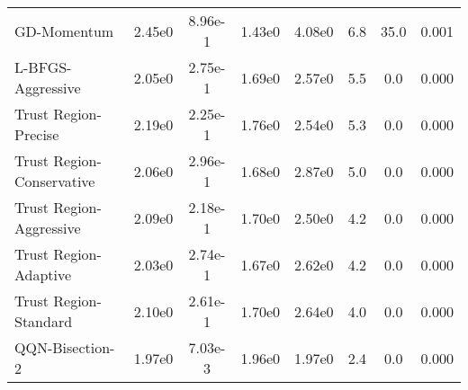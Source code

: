 \documentclass{article}
\begin{document}
\begin{table}[htbp]
{\begin{tabular}{p{2.5cm}*{7}{c}}
GD-Momentum & 2.45e0 & 8.96e-1 & 1.43e0 & 4.08e0 & 6.8 & 35.0 & 0.001 \\
L-BFGS-Aggressive & 2.05e0 & 2.75e-1 & 1.69e0 & 2.57e0 & 5.5 & 0.0 & 0.000 \\
Trust Region-Precise & 2.19e0 & 2.25e-1 & 1.76e0 & 2.54e0 & 5.3 & 0.0 & 0.000 \\
Trust Region-Conservative & 2.06e0 & 2.96e-1 & 1.68e0 & 2.87e0 & 5.0 & 0.0 & 0.000 \\
Trust Region-Aggressive & 2.09e0 & 2.18e-1 & 1.70e0 & 2.50e0 & 4.2 & 0.0 & 0.000 \\
Trust Region-Adaptive & 2.03e0 & 2.74e-1 & 1.67e0 & 2.62e0 & 4.2 & 0.0 & 0.000 \\
Trust Region-Standard & 2.10e0 & 2.61e-1 & 1.70e0 & 2.64e0 & 4.0 & 0.0 & 0.000 \\
QQN-Bisection-2 & 1.97e0 & 7.03e-3 & 1.96e0 & 1.97e0 & 2.4 & 0.0 & 0.000 \\
\bottomrule
\end{tabular}
}
\end{table}
\end{document}
